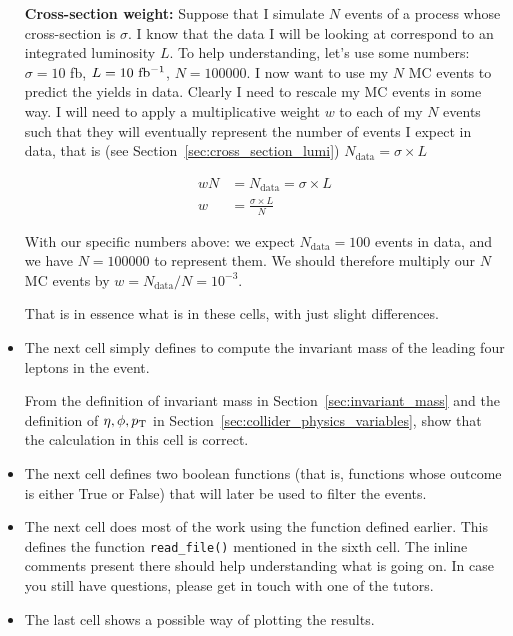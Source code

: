 \begin{itemize}
\begin{definition}
\textbf{Cross-section weight:} Suppose that I simulate $N$ events of a process whose cross-section is $\sigma$. I know that the data I will be looking at correspond to an integrated luminosity $L$. To help understanding, let's use some numbers: $\sigma = 10$ fb, $L = 10\ \mbox{fb\(^{-1}\)}$, $N = 100000$. I now want to use my $N$ MC events to predict the yields in data. Clearly I need to rescale my MC events in some way. I will need to apply a multiplicative weight $w$ to each of my $N$ events such that they will eventually represent the number of events I expect in data, that is (see Section~\ref{sec:cross_section_lumi}) $N_{\mathrm{data}} = \sigma \times L$

\begin{align*} 
wN &= N_{\mathrm{data}} = \sigma \times L \\ 
w &= \frac{\sigma \times L}{N}
\end{align*} 

With our specific numbers above: we expect $N_{\mathrm{data}} = 100$ events in data, and we have $N = 100000$ to represent them. We should therefore multiply our $N$ MC events by $w = N_{\mathrm{data}}/N = 10^{-3}$. 
\end{definition}

That is in essence what is in these cells, with just slight differences. 

\item The next cell simply defines to compute the invariant mass of the leading four leptons in the event. 

\begin{exercise}
From the definition of invariant mass in Section~\ref{sec:invariant_mass} and the definition of $\eta, \phi, p_{\mathrm{T}}$ in Section~\ref{sec:collider_physics_variables}, show that the calculation in this cell is correct. 
\end{exercise}


\item The next cell defines two boolean functions (that is, functions whose outcome is either True or False) that will later be used to filter the events. 
\item The next cell does most of the work using the function defined earlier. This defines the function \verb|read_file()| mentioned in the sixth cell. The inline comments present there should help understanding what is going on. In case you still have questions, please get in touch with one of the tutors. 
\item The last cell shows a possible way of plotting the results. 
\end{itemize}

